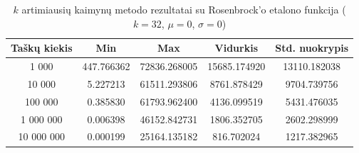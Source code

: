 \begin{table}[H]
    \centering
    \begin{tabular}{|c|c|c|c|c|}
        \hline
        \textbf{Taškų kiekis} & \textbf{Min} & \textbf{Max} & \textbf{Vidurkis} & \textbf{Std. nuokrypis} \\ \hline
        1 000        & 447.766362 & 72836.268005 & 15685.174920 & 13110.182038 \\ \hline
        10 000       & 5.227213 & 61511.293806 & 8761.878429 & 9704.739756 \\ \hline
        100 000      & 0.385830 & 61793.962400 & 4136.099519 & 5431.476035 \\ \hline
        1 000 000    & 0.006398 & 46152.842731 & 1806.352705 & 2602.298999 \\ \hline
        10 000 000   & 0.000199 & 25164.135182 & 816.702024 & 1217.382965 \\ \hline
    \end{tabular}
    \caption{$k$ artimiausių kaimynų metodo rezultatai su Rosenbrock'o etalono funkcija ($k = 32$, $\mu = 0$, $\sigma = 0$)}
\end{table}